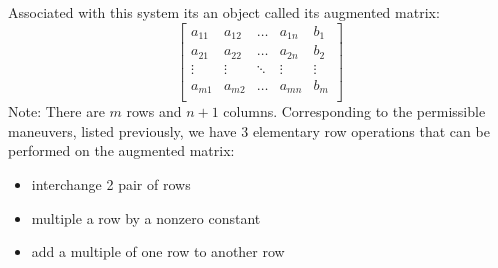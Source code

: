 \documentclass[12pt]{article}
\begin{document}
Associated with this system its an object called its augmented matrix: 
$$ \begin{bmatrix} 
a_{11} & a_{12} & \ldots & a_{1n} & b_1 \\
a_{21} & a_{22} & \ldots & a_{2n} & b_2 \\ 
\vdots & \vdots & \ddots & \vdots & \vdots \\
a_{m1} & a_{m2} & \ldots & a_{mn} & b_m \\
\end{bmatrix} $$
Note: There are $m$ rows and $n + 1$ columns. \newpage
Corresponding to the permissible maneuvers, listed previously, we have 3 elementary row operations that can be performed on the augmented matrix: 
\begin{itemize}
\item interchange 2 pair of rows
\item multiple a row by a nonzero constant
\item add a multiple of one row to another row \end{itemize} 
\end{document}
